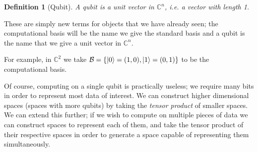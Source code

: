 \documentclass{article}
\renewcommand{\ket}{\Ket}
\theoremstyle{plain}
\theoremstyle{centered}
\newtheorem{definition}{Definition}
\renewcommand{\ket}{\Ket}
\newcommand{\camelia}{{\color{red}comment: }}
\newcommand{\bb}[1]{\mathbb{#1}}
\renewcommand{\cal}[1]{\mathcal{#1}}
\begin{document}
        \begin{definition}[Qubit]\label{def:qubit}
            A \textit{qubit} is a unit vector in $\bb{C}^n$, i.e. a vector with length 1.
        \end{definition}
        These are simply new terms for objects that we have already seen; the computational basis will be the name we give the standard basis and a qubit is the name that we give a unit vector in $\bb{C}^n$.

        
        For example, in $\bb{C}^2$ we take $\cal{B} = \{\ket{0} = (1,0), \ket{1} = (0, 1)\}$ to be the computational basis.
        
        Of course, computing on a single qubit is practically useless; we require many bits in order to represent most data of interest.
        We can construct higher dimensional spaces (spaces with more qubits) by taking the \textit{tensor product} of smaller spaces.
        We can extend this further; if we wish to compute on multiple pieces of data we can construct spaces to represent each of them, and take the tensor product of their respective spaces in order to generate a space capable of representing them simultaneously.

\end{document}
